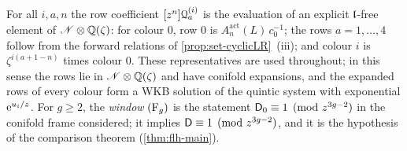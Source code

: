 \begin{cor}
\label{cor:gau-rowsNN}
For all $i,a,n$ the row coefficient $[z^n]\mathcal{Q}^{(i)}_a$ is the evaluation of an explicit $\mathfrak{l}$-free element of $\mathscr{N}\otimes\mathbb{Q}(\zeta)$: for colour $0$, row $0$ is $A^{\mathrm{act}}_n(L)\,c_0^{-1}$; the rows $a=1,\dots,4$ follow from the forward relations of \cref{prop:set-cyclicLR}~(iii); and colour $i$ is $\zeta^{i(a+1-n)}$ times colour $0$. These representatives are used throughout; in this sense the rows lie in $\mathscr{N}\otimes\mathbb{Q}(\zeta)$ and have conifold expansions, and the expanded rows of every colour form a WKB solution of the quintic system with exponential $\mathrm{e}^{u_i/z}$. For $g\geq2$, the \emph{window} $(\mathrm{F}_{g})$ is the statement $\mathsf{D}_0\equiv1\pmod{z^{3g-2}}$ in the conifold frame considered; it implies $\mathsf{D}\equiv1\pmod{z^{3g-2}}$, and it is the hypothesis of the comparison theorem (\cref{thm:flh-main}).
\label{def:gau-Fg}
\end{cor}
